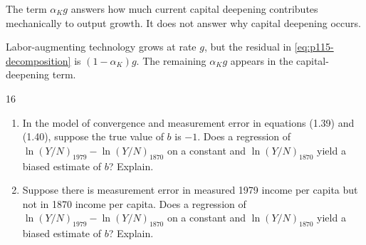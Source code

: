 \begin{note}
    The term \(\alpha_K g\) answers how much current capital deepening
    contributes mechanically to output growth. It does not answer why capital
    deepening occurs.
\end{note}

\begin{note}
    Labor-augmenting technology grows at rate \(g\), but the residual in
    \eqref{eq:p115-decomposition} is \((1-\alpha_K)g\). The remaining
    \(\alpha_K g\) appears in the capital-deepening term.
\end{note}

\begin{problem}{16}
\begin{enumerate}[label=(\alph*)]
    \item In the model of convergence and measurement error in equations (1.39) and (1.40), suppose
    the true value of \(b\) is \(-1\). Does a regression of
    \(\ln\left(Y/N\right)_{1979}-\ln\left(Y/N\right)_{1870}\) on a constant and
    \(\ln\left(Y/N\right)_{1870}\) yield a biased estimate of \(b\)? Explain.
    \item Suppose there is measurement error in measured 1979 income per capita but not in 1870
    income per capita. Does a regression of
    \(\ln\left(Y/N\right)_{1979}-\ln\left(Y/N\right)_{1870}\) on a constant and
    \(\ln\left(Y/N\right)_{1870}\) yield a biased estimate of \(b\)? Explain.
\end{enumerate}
\end{problem}

